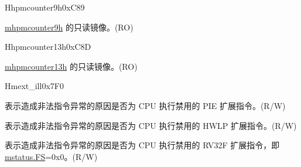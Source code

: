 \begin{register}{H}{hpmcounter9h}{0xC89}\label{regdesc:HPMCOUNTER9H}
%
\regnewline%
\begin{regdesc}\begin{reglist}
\label{fielddesc:HPMCOUNTER9H}\item [HPMCOUNTER9H] \hyperref[regdesc:MHPMCOUNTER9H]{mhpmcounter9h} 的只读镜像。(RO)
\end{reglist}\end{regdesc}
\end{register}


\begin{register}{H}{hpmcounter13h}{0xC8D}\label{regdesc:HPMCOUNTER13H}
%
\regnewline%
\begin{regdesc}\begin{reglist}
\label{fielddesc:HPMCOUNTER13H}\item [HPMCOUNTER13H] \hyperref[regdesc:MHPMCOUNTER13H]{mhpmcounter13h} 的只读镜像。(RO)
\end{reglist}\end{regdesc}
\end{register}

\begin{register}{H}{mext\_ill}{0x7F0}\label{regdesc:MEXT_ILL}%
%
%
%
%
\regnewline%
\begin{regdesc}\begin{reglist}
\label{fielddesc:MEXT_ILL_PIE_ILL}\item [PIE\_ILL] 表示造成非法指令异常的原因是否为 CPU 执行禁用的 PIE 扩展指令。(R/W)
\label{fielddesc:MEXT_ILL_HWLP_ILL}\item [HWLP\_ILL] 表示造成非法指令异常的原因是否为 CPU 执行禁用的 HWLP 扩展指令。(R/W)
\label{fielddesc:MEXT_ILL_FP_ILL}\item [FP\_ILL] 表示造成非法指令异常的原因是否为 CPU 执行禁用的 RV32F 扩展指令，即 \hyperref[fielddesc:MSTATUS_FS]{mstatus.FS}=0x0。(R/W)
\end{reglist}\end{regdesc}
\end{register}

